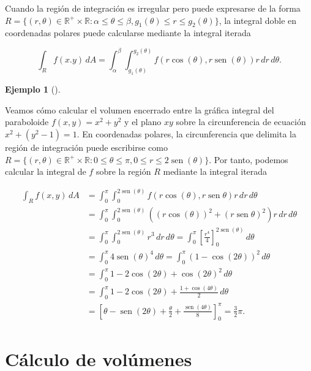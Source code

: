\documentclass[
  a4paper,
]{scrreport}
\theoremstyle{plain}
\theoremstyle{definition}
\theoremstyle{plain}
\theoremstyle{plain}
\theoremstyle{definition}
\newtheorem{example}{Ejemplo}[chapter]
\theoremstyle{definition}
\theoremstyle{remark}
\begin{document}
Cuando la región de integración es irregular pero puede expresarse de la
forma
\(R=\{(r,\theta)\in \mathbb{R}^+\times \mathbb{R}: \alpha\leq \theta\leq \beta, g_1(\theta)\leq r\leq g_2(\theta)\}\),
la integral doble en coordenadas polares puede calcularse mediante la
integral iterada

\[
\int_R f(x.y)\,dA 
= \int_{\alpha}^{\beta} \int_{g_1(\theta)}^{g_2(\theta)} f(r\cos(\theta),r\operatorname{sen}(\theta))r\,dr\,d\theta.
\]

\begin{example}[]\protect\hypertarget{exm-integral-region-irregular-polar}{}\label{exm-integral-region-irregular-polar}

Veamos cómo calcular el volumen encerrado entre la gráfica integral del
paraboloide \(f(x,y)=x^2+y^2\) y el plano \(xy\) sobre la circunferencia
de ecuación \(x^2+(y^2-1)=1\). En coordenadas polares, la circunferencia
que delimita la región de integración puede escribirse como
\(R=\{(r,\theta)\in \mathbb{R}^+\times \mathbb{R}: 0\leq \theta\leq \pi, 0\leq r\leq 2\operatorname{sen}(\theta)\}\).
Por tanto, podemos calcular la integral de \(f\) sobre la región \(R\)
mediante la integral iterada

\begin{align*}
\int_R f(x,y)\,dA
&= \int_0^\pi \int_0^{2\operatorname{sen}(\theta)} f(r\cos(\theta),r\operatorname{sen}{\theta})r\,dr\,d\theta \\
&= \int_0^\pi \int_0^{2\operatorname{sen}(\theta)} ((r\cos(\theta))^2 + (r\operatorname{sen}{\theta})^2)r\,dr\,d\theta \\
&= \int_0^\pi \int_0^{2\operatorname{sen}(\theta)} r^3\,dr\,d\theta 
= \int_0^\pi \left[\frac{r^4}{4}\right]_0^{2\operatorname{sen}(\theta)} \,d\theta \\
&= \int_0^\pi 4\operatorname{sen}(\theta)^4 \,d\theta 
= \int_0^\pi (1-\cos(2\theta))^2\,d\theta \\ 
&= \int_0^\pi 1 - 2\cos(2\theta) + \cos(2\theta)^2 \,d\theta \\
&= \int_0^\pi 1 - 2\cos(2\theta) + \frac{1+\cos(4\theta)}{2}\,d\theta \\
&= \left[\theta - \operatorname{sen}(2\theta) + \frac{\theta}{2} + \frac{\operatorname{sen}(4\theta)}{8}\right]_0^\pi
= \frac{3}{2}\pi.
\end{align*}

\end{example}

\section{Cálculo de volúmenes}\label{cuxe1lculo-de-voluxfamenes}
\end{document}
